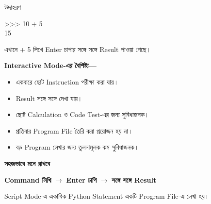 \begin{examplebox}{উদাহরণ}

\begin{codebox}

\begin{english}
\ttfamily
>>> 10 + 5\\
15
\end{english}

\end{codebox}

এখানে
\textenglish{ + 5}
লিখে Enter চাপার সঙ্গে সঙ্গে
\textenglish{}
Result পাওয়া গেছে।

\end{examplebox}

\textbf{Interactive Mode-এর বৈশিষ্ট্য—}

\begin{itemize}

\item একবারে ছোট Instruction পরীক্ষা করা যায়।

\item Result সঙ্গে সঙ্গে দেখা যায়।

\item ছোট Calculation ও Code Test-এর জন্য সুবিধাজনক।

\item প্রতিবার Program File তৈরি করা প্রয়োজন হয় না।

\item বড় Program লেখার জন্য তুলনামূলক কম সুবিধাজনক।

\end{itemize}

\begin{rememberbox}

\textbf{\color{deepOrange}সহজভাবে মনে রাখবে}

\begin{center}

\textbf{Command লিখি}
\(\longrightarrow\)
\textbf{Enter চাপি}
\(\longrightarrow\)
\textbf{সঙ্গে সঙ্গে Result}

\end{center}

\end{rememberbox}



Script Mode-এ একাধিক Python Statement একটি Program File-এ
লেখা হয়।

